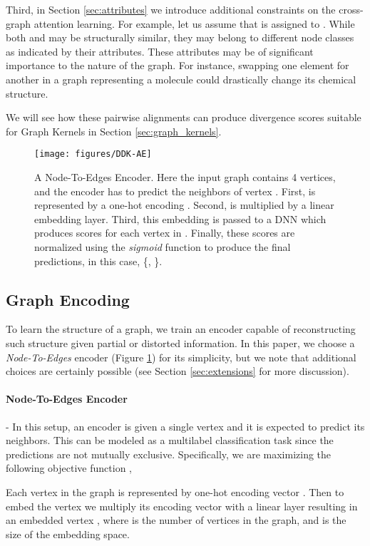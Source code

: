 \documentclass[sigconf]{acmart}
\begin{document}
Third, in Section \ref{sec:attributes} we introduce additional constraints on the cross-graph attention learning.
For example, let us assume that  is assigned to .
While both  and  may be structurally similar, they may belong to different node classes as indicated by their attributes.
These attributes may be of significant importance to the nature of the graph.  For instance, swapping one element for another in a graph representing a molecule could drastically change its chemical structure.

We will see how these pairwise alignments can produce divergence scores suitable for Graph Kernels in Section \ref{sec:graph_kernels}.

\begin{figure}[t]
\centering
\texttt{[image: figures/DDK-AE]}
\caption{A Node-To-Edges Encoder.
Here the input graph contains 4 vertices, and the encoder has to predict the neighbors of vertex .
First,  is represented by a one-hot encoding .
Second,  is multiplied by a linear embedding layer.
Third, this embedding  is passed to a DNN which produces scores for each vertex in .
Finally, these scores are normalized using the \emph{sigmoid} function to produce the final predictions, in this case, \{, \}.}
\label{fig:ae}
\end{figure}




\subsection{Graph Encoding}
\label{sec:encoding}
To learn the structure of a graph, we train an encoder capable of reconstructing such structure given partial or distorted information.
In this paper, we choose a \emph{Node-To-Edges} encoder (Figure \ref{fig:ae}) for its simplicity, but we note that additional choices are certainly possible (see Section \ref{sec:extensions} for more discussion).
\paragraph{Node-To-Edges Encoder} -
In this setup, an encoder is given a single vertex and it is expected to predict its neighbors.
This can be modeled as a multilabel classification task since the predictions are not mutually exclusive.
Specifically, we are maximizing the following objective function ,

Each vertex  in the graph is represented by one-hot encoding vector .
Then to embed the vertex we multiply its encoding vector with a linear layer  resulting in an embedded vertex , where  is the number of vertices in the graph, and  is the size of the embedding space.
\end{document}
